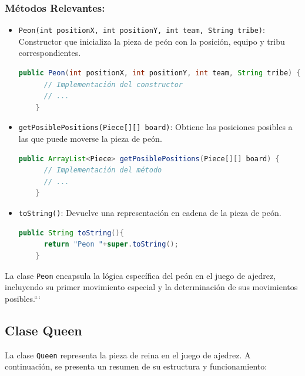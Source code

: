 \documentclass{article}
\begin{document}
\subsubsection{Métodos Relevantes:}
\begin{itemize}
  \item \texttt{Peon(int positionX, int positionY, int team, String tribe)}: Constructor que inicializa la pieza de peón con la posición, equipo y tribu correspondientes.
  \begin{lstlisting}[language=java,caption={Constructor \texttt{Peon} en la clase \texttt{Peon}}]
    public Peon(int positionX, int positionY, int team, String tribe) {
      // Implementación del constructor
      // ...
    }
  \end{lstlisting}

  \item \texttt{getPosiblePositions(Piece[][] board)}: Obtiene las posiciones posibles a las que puede moverse la pieza de peón.
  \begin{lstlisting}[language=java,caption={Método \texttt{getPosiblePositions} en la clase \texttt{Peon}}]
    public ArrayList<Piece> getPosiblePositions(Piece[][] board) {
      // Implementación del método
      // ...
    }
  \end{lstlisting}

  \item \texttt{toString()}: Devuelve una representación en cadena de la pieza de peón.
  \begin{lstlisting}[language=java,caption={Método \texttt{toString} en la clase \texttt{Peon}}]
    public String toString(){
      return "Peon "+super.toString();
    }
  \end{lstlisting}
\end{itemize}

La clase \texttt{Peon} encapsula la lógica específica del peón en el juego de ajedrez, incluyendo su primer movimiento especial y la determinación de sus movimientos posibles.```


\subsection{Clase Queen}
La clase \texttt{Queen} representa la pieza de reina en el juego de ajedrez. A continuación, se presenta un resumen de su estructura y funcionamiento:
\end{document}
